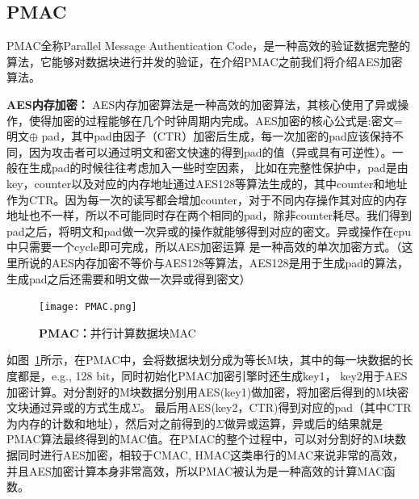 \subsection{PMAC}
PMAC全称Parallel Message Authentication Code，是一种高效的验证数据完整的算法，它能够对数据块进行并发的验证，在介绍PMAC之前我们将介绍AES加密算法。

\textbf{AES内存加密：} AES内存加密算法是一种高效的加密算法，其核心使用了异或操作，使得加密的过程能够在几个时钟周期内完成。AES加密的核心公式是:密文=明文$\oplus$ pad，其中pad由因子（CTR）加密后生成，每一次加密的pad应该保持不同，因为攻击者可以通过明文和密文快速的得到pad的值（异或具有可逆性）。一般在生成pad的时候往往考虑加入一些时空因素，
比如在完整性保护中，pad是由key，counter以及对应的内存地址通过AES128等算法生成的，其中counter和地址作为CTR。因为每一次的读写都会增加counter，对于不同内存操作其对应的内存地址也不一样，所以不可能同时存在两个相同的pad，除非counter耗尽。我们得到pad之后，将明文和pad做一次异或的操作就能够得到对应的密文。异或操作在cpu中只需要一个cycle即可完成，所以AES加密运算
是一种高效的单次加密方式。（这里所说的AES内存加密不等价与AES128等算法，AES128是用于生成pad的算法，生成pad之后还需要和明文做一次异或得到密文）
\begin{figure}[!htp]
  \centering
  \texttt{[image: PMAC.png]}
  \caption{\textbf{PMAC：}并行计算数据块MAC}
 \label{fig:PMAC.png}
\end{figure}

如图~\ref{fig:PMAC.png}所示，在PMAC中，会将数据块划分成为等长M块，其中的每一块数据的长度都是，e.g., 128 bit，同时初始化PMAC加密引擎时还生成key1， key2用于AES加密计算。对分割好的M块数据分别用AES(key1)做加密，将加密后得到的M块密文块通过异或的方式生成$\Sigma$。
最后用AES(key2，CTR)得到对应的pad（其中CTR为内存的计数和地址），然后对之前得到的$\Sigma$做异或运算，异或后的结果就是PMAC算法最终得到的MAC值。在PMAC的整个过程中，可以对分割好的M块数据同时进行AES加密，相较于CMAC, HMAC这类串行的MAC来说非常的高效，并且AES加密计算本身非常高效，所以PMAC被认为是一种高效的计算MAC函数。

